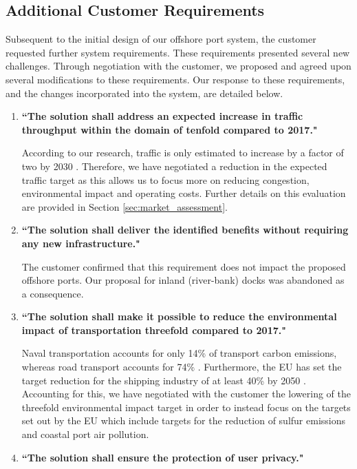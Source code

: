 \subsection{Additional Customer Requirements}

Subsequent to the initial design of our offshore port system, the customer requested further system requirements. These requirements presented several new challenges. Through negotiation with the customer, we proposed and agreed upon several modifications to these requirements. Our response to these requirements, and the changes incorporated into the system, are detailed below.

\begin{enumerate}[label={\textbf{(\arabic*)}}, itemsep=3pt, topsep=4pt]
\item \textbf{``The solution shall address an expected increase in traffic throughput within the domain of tenfold compared to 2017."}

	According to our research, traffic is only estimated to increase by a factor of two by 2030 \cite{oecd}. Therefore, we have negotiated a reduction in the expected traffic target as this allows us to focus more on reducing congestion, environmental impact and operating costs. Further details on this evaluation are provided in Section \ref{sec:market_assessment}.
	
\item \textbf{``The solution shall deliver the identified benefits without requiring any new infrastructure."}

	The customer confirmed that this requirement does not impact the proposed offshore ports. Our proposal for inland (river-bank) docks was abandoned as a consequence.

\item \textbf{``The solution shall make it possible to reduce the environmental impact of transportation threefold compared to 2017."}

	Naval transportation accounts for only 14\% of transport carbon emissions, whereas road transport accounts for 74\% \cite{atag}. Furthermore, the EU has set the target reduction for the shipping industry of at least 40\% by 2050 \cite{eu-shipping}. Accounting for this, we have negotiated with the customer the lowering of the threefold environmental impact target in order to instead focus on the targets set out by the EU which include targets for the reduction of sulfur emissions and coastal port air pollution.

\item \textbf{``The solution shall ensure the protection of user privacy."}


\end{enumerate}

